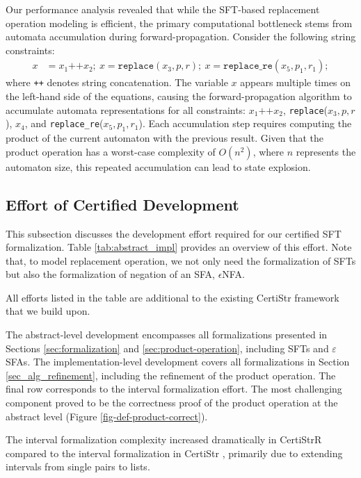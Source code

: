 Our performance analysis revealed that while the SFT-based replacement operation modeling is efficient, the primary computational bottleneck stems from automata accumulation during  forward-propagation. Consider the following string constraints:
\begin{align}
x &= x_1\texttt{++}x_2;~x = \texttt{replace}(x_3, p, r); \nonumber ~x = \texttt{replace\_re}(x_5, p_1, r_1); \nonumber
\end{align}
where \texttt{++} denotes string concatenation. The variable $x$ appears multiple times on the left-hand side of the equations, causing the forward-propagation algorithm to accumulate automata representations for all constraints: $x_1\texttt{++}x_2$, \texttt{replace}\newline($x_3, p, r$), $x_4$, and \texttt{replace\_re}($x_5, p_1, r_1$). Each accumulation step requires computing the product of the current automaton with the previous result. Given that the product operation has a worst-case complexity of $O(n^2)$, where $n$ represents the automaton size, this repeated accumulation can lead to state explosion.


\subsection{Effort of Certified Development}

This subsection discusses the development effort required for our certified SFT formalization. Table \ref{tab:abstract_impl} provides an overview of this effort.
Note that, to model replacement operation, we not only need the formalization of SFTs but also the formalization of negation of an SFA, $\epsilon$NFA.

All efforts listed in the table are additional to the existing CertiStr framework that we build upon.

The abstract-level development encompasses all formalizations presented in Sections \ref{sec:formalization} and \ref{sec:product-operation}, including SFTs and $\varepsilon$SFAs. The implementation-level development covers all formalizations in Section \ref{sec_alg_refinement}, including the refinement of the product operation. The final row corresponds to the interval formalization effort. The most challenging component proved to be the correctness proof of the product operation at the abstract level (Figure \ref{fig-def-product-correct}).

The interval formalization complexity increased dramatically in CertiStrR compared to the interval formalization in CertiStr \cite{cpp/KanLRS22}, primarily due to extending intervals from single pairs to lists.

